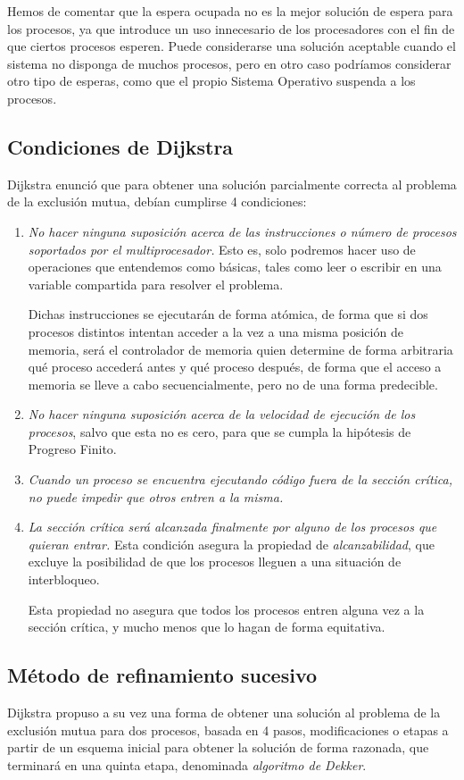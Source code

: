 Hemos de comentar que la espera ocupada no es la mejor solución de espera para los procesos, ya que introduce un uso innecesario de los procesadores con el fin de que ciertos procesos esperen. Puede considerarse una solución aceptable cuando el sistema no disponga de muchos procesos, pero en otro caso podríamos considerar otro tipo de esperas, como que el propio Sistema Operativo suspenda a los procesos.

\subsection{Condiciones de Dijkstra}
Dijkstra enunció que para obtener una solución parcialmente correcta al problema de la exclusión mutua, debían cumplirse 4 condiciones:
\begin{enumerate}
    \item \textit{No hacer ninguna suposición acerca de las instrucciones o número de procesos soportados por el multiprocesador.} Esto es, solo podremos hacer uso de operaciones que entendemos como básicas, tales como leer o escribir en una variable compartida para resolver el problema.

        Dichas instrucciones se ejecutarán de forma atómica, de forma que si dos procesos distintos intentan acceder a la vez a una misma posición de memoria, será el controlador de memoria quien determine de forma arbitraria qué proceso accederá antes y qué proceso después, de forma que el acceso a memoria se lleve a cabo secuencialmente, pero no de una forma predecible.
    \item \textit{No hacer ninguna suposición acerca de la velocidad de ejecución de los procesos}, salvo que esta no es cero, para que se cumpla la hipótesis de Progreso Finito.
    \item \textit{Cuando un proceso se encuentra ejecutando código fuera de la sección crítica, no puede impedir que otros entren a la misma.}
    \item \textit{La sección crítica será alcanzada finalmente por alguno de los procesos que quieran entrar.} Esta condición asegura la propiedad de \textit{alcanzabilidad}, que excluye la posibilidad de que los procesos lleguen a una situación de interbloqueo.

        Esta propiedad no asegura que todos los procesos entren alguna vez a la sección crítica, y mucho menos que lo hagan de forma equitativa.
\end{enumerate}

\subsection{Método de refinamiento sucesivo}
Dijkstra propuso a su vez una forma de obtener una solución al problema de la exclusión mutua para dos procesos, basada en 4 pasos, modificaciones o etapas a partir de un esquema inicial para obtener la solución de forma razonada, que terminará en una quinta etapa, denominada \textit{algoritmo de Dekker}.


